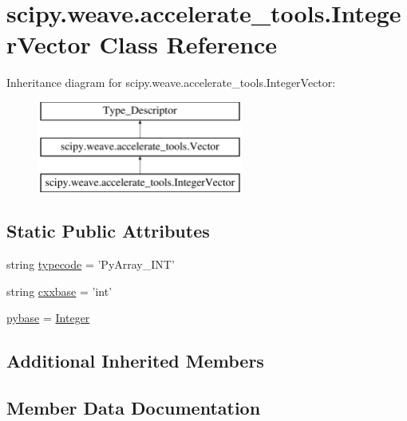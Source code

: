 \hypertarget{classscipy_1_1weave_1_1accelerate__tools_1_1IntegerVector}{}\section{scipy.\+weave.\+accelerate\+\_\+tools.\+Integer\+Vector Class Reference}
\label{classscipy_1_1weave_1_1accelerate__tools_1_1IntegerVector}
Inheritance diagram for scipy.\+weave.\+accelerate\+\_\+tools.\+Integer\+Vector\+:\begin{figure}[H]
\begin{center}
\leavevmode
\includegraphics[height=3.000000cm]{classscipy_1_1weave_1_1accelerate__tools_1_1IntegerVector}
\end{center}
\end{figure}
\subsection*{Static Public Attributes}
\begin{DoxyCompactItemize}
\item 
string \hyperlink{classscipy_1_1weave_1_1accelerate__tools_1_1IntegerVector_a779c730be21616fcdeb5589f60d7351f}{typecode} = 'Py\+Array\+\_\+\+I\+N\+T'
\item 
string \hyperlink{classscipy_1_1weave_1_1accelerate__tools_1_1IntegerVector_a309f3b54126ad8e0fe1a1d5ffb43df6c}{cxxbase} = 'int'
\item 
\hyperlink{classscipy_1_1weave_1_1accelerate__tools_1_1IntegerVector_affa300b578d5f1c43be0594868b827dc}{pybase} = \hyperlink{classscipy_1_1weave_1_1accelerate__tools_1_1Integer}{Integer}
\end{DoxyCompactItemize}
\subsection*{Additional Inherited Members}


\subsection{Member Data Documentation}
\hypertarget{classscipy_1_1weave_1_1accelerate__tools_1_1IntegerVector_a309f3b54126ad8e0fe1a1d5ffb43df6c}{}
